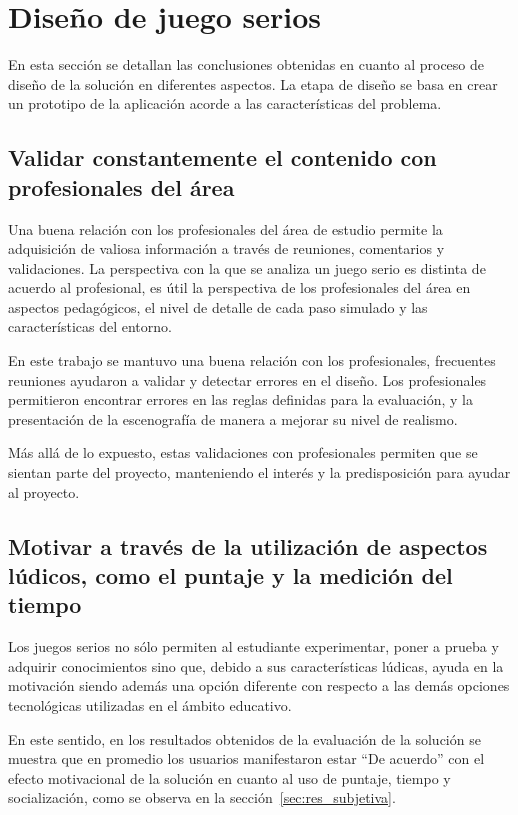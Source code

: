 \section{Diseño de juego serios}

En esta sección se detallan las conclusiones obtenidas en cuanto al proceso de
diseño de la solución en diferentes aspectos. La etapa de diseño se basa en 
crear un prototipo de la aplicación acorde a las características del problema.


\subsection{Validar constantemente el contenido con profesionales del área}

Una buena relación con los profesionales del área de estudio permite la
adquisición de valiosa información a través de reuniones, comentarios y
validaciones. La perspectiva con la que se analiza un juego serio es distinta de
acuerdo al profesional, es útil la perspectiva de los profesionales del área en
aspectos pedagógicos, el nivel de detalle de cada paso simulado y las
características del entorno.

En este trabajo se mantuvo una buena relación con los profesionales, frecuentes
reuniones ayudaron a validar y detectar errores en el diseño. Los profesionales
permitieron encontrar errores en las reglas definidas para la evaluación, y la
presentación de la escenografía de manera a mejorar su nivel de realismo.

Más allá de lo expuesto, estas validaciones con profesionales permiten que se
sientan parte del proyecto, manteniendo el interés y la predisposición para
ayudar al proyecto.


\subsection{Motivar a través de la utilización de aspectos lúdicos, como el
    puntaje y la medición del tiempo}

Los juegos serios no sólo permiten al estudiante experimentar, poner a prueba y
adquirir conocimientos sino que, debido a sus características lúdicas, ayuda en
la motivación siendo además una opción diferente con respecto a las demás
opciones tecnológicas utilizadas en el ámbito educativo.
    
En este sentido, en los resultados obtenidos de la evaluación de la solución se
muestra que en promedio los usuarios manifestaron estar \enquote{De acuerdo} con
el efecto motivacional de la solución en cuanto al uso de puntaje, tiempo y
socialización, como se observa en la sección~\ref{sec:res_subjetiva}.

